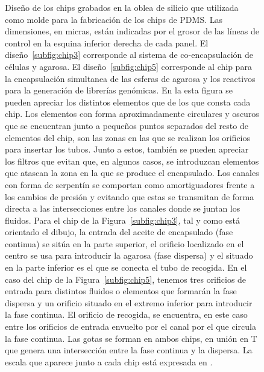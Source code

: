 \begin{figure}[H]
\captionsetup[subfigure]{labelformat=empty}
  \begin{center} 
  
    \subfloat[]{
     \label{subfig:chip3}
     \ref{subfig:chip3}
      }
    \hspace{1cm}
    \subfloat[]{
     \label{subfig:chip5}
     \ref{subfig:chip5}
      }
  \end{center}
  \vspace{-5mm}
  \caption{\small Diseño de los chips grabados en la oblea de silicio que utilizada como molde para la fabricación de los chips de PDMS. Las dimensiones, en micras, están indicadas por el grosor de las líneas de control en la esquina inferior derecha de cada panel.  El diseño~\ref{subfig:chip3}  corresponde al sistema de co-encapsulación de células y agarosa. El diseño~\ref{subfig:chip5} corresponde al chip para la encapsulación simultanea de las esferas de agarosa y los reactivos para la generación de librerías genómicas. En la esta figura se pueden apreciar los distintos elementos que de los que consta cada chip. Los elementos con forma aproximadamente circulares y oscuros que se encuentran junto a pequeños puntos separados del resto de elementos del chip, son las zonas en las que se realizan los orificios para insertar los tubos. Junto a estos, también se pueden apreciar los filtros que evitan que, en algunos casos, se introduzcan elementos que atascan la zona en la que se produce el encapsulado. Los canales con forma de serpentín se comportan como amortiguadores frente a los cambios de presión y evitando que estas se transmitan de forma directa a las intersecciones entre los canales donde se juntan los fluidos. Para el chip de la Figura~\ref{subfig:chip3}, tal y como está orientado el dibujo, la entrada del aceite de encapsulado (fase continua) se sitúa en la parte superior, el orificio localizado en el centro se usa para introducir la agarosa (fase dispersa) y el situado en la parte inferior es el que se conecta el tubo de recogida. En el caso del chip de la Figura~\ref{subfig:chip5}, tenemos tres orificios de entrada para distintos fluidos o elementos que formarán la fase dispersa y un orificio situado en el extremo inferior para introducir la fase continua. El orificio de recogida, se encuentra, en este caso entre los orificios de entrada envuelto por el canal por el que circula la fase continua. Las gotas se forman en ambos chips, en unión en T que genera una intersección entre  la fase continua y la dispersa. La escala que aparece junto a cada chip está expresada en \micrometro.}
  \label{fig:chips}
\end{figure}

